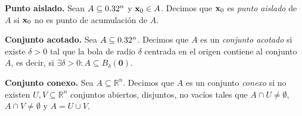    \begin{definition} \textbf{Punto aislado.} \label{def:pto_ais}
    Sean $A  \subseteq   0.32^n$ y $\vect{x}_0 \in A$. Decimos que $\vect{x}_0$ es \emph{punto aislado} de $A$ si $\vect{x}_0$ no es punto de acumulaci\'on de $A$.
   \end{definition}
   
   \begin{definition} \textbf{Conjunto acotado.} \label{def:conj_acotado}
    Sea $A  \subseteq  0.32^n$. Decimos que $A$ es un \emph{conjunto acotado} si existe $\delta > 0$ tal que la bola de radio $\delta$  centrada en el origen contiene al conjunto $A$, es decir, si $\exists \delta > 0 : A  \subseteq  B_{\delta}(\mathbf{0})$.\\
   \end{definition}


\begin{definition} \textbf{Conjunto  conexo.} Sea   $A \subseteq  \mathbb{R}^{n}$. Decimos que $A$  es un conjunto \emph{conexo}  si   no existen $U,V  \subseteq  \mathbb{R}^{n} $  conjuntos abiertos, disjuntos, no vac\'ios   tales que  \(A \cap U \neq \emptyset\), \(A \cap V \neq \emptyset\) y \(A = U \cup V\).
\end{definition}


